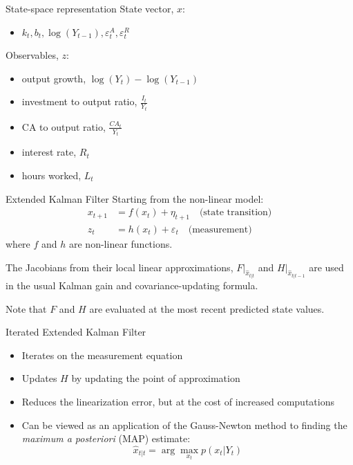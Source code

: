 \documentclass{beamer}
\begin{document}
\begin{frame}{State-space representation}
    State vector, $x$:
    \begin{itemize}
        \item $k_t, b_t, \log(Y_{t-1}), \varepsilon^A_t, \varepsilon^R_t$
    \end{itemize}
    
    \bigskip
    Observables, $z$:
    \begin{itemize}
        \item output growth, $\log(Y_t) - \log(Y_{t-1})$
        \item investment to output ratio, $\frac{I_t}{Y_t}$
        \item CA to output ratio, $\frac{CA_t}{Y_t}$
        \item interest rate, $R_t$
        \item hours worked, $L_t$
    \end{itemize}
\end{frame}

\begin{frame}{Extended Kalman Filter}
    Starting from the non-linear model:
    \begin{align*}
        x_{t+1} & = f(x_{t}) + \eta_{t+1} \quad \text{(state transition)} \\
        z_t & = h(x_t) + \varepsilon_t \quad \text{(measurement)}
    \end{align*}
    where $f$ and $h$ are non-linear functions.

    \bigskip
    \bigskip
    The Jacobians from their local linear approximations, $F|_{\hat{x}_{t|t}}$ and $H|_{\hat{x}_{t|t-1}}$
    are used in the usual Kalman gain and covariance-updating formula.

    \bigskip
    \bigskip
    Note that $F$ and $H$ are evaluated at the most recent predicted state values.
    
    
\end{frame}

\begin{frame}{Iterated Extended Kalman Filter}
    \begin{itemize}
        \item Iterates on the measurement equation
            \bigskip
        \item Updates $H$ by updating the point of approximation
            \bigskip
        \item Reduces the linearization error, but at the cost of increased computations
            \bigskip
        \item Can be viewed as an application of the Gauss-Newton method
            to finding the \emph{maximum a posteriori} (MAP) estimate:
            \[
                \hat{x}_{t|t} = \arg \max_{x_t} p(x_t|Y_t)
            \]
    \end{itemize}
    
\end{frame}
\end{document}
